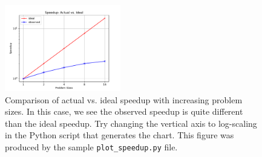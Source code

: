 \begin{figure}
    \centering
    \includegraphics[width=0.45\textwidth]{Figure_1.pdf}
    \caption{Comparison of actual vs. ideal speedup with increasing problem sizes. In this case, we see the observed speedup is quite different than the ideal speedup. Try changing the vertical axis to log-scaling in the Python script that generates the chart. This figure was produced by the sample \texttt{plot\_speedup.py} file.}
    \label{fig:my_label}
\end{figure}

